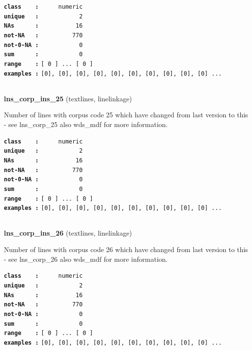 \documentclass[]{article}
\begin{document}
\textbf{\texttt{class\ \ \ \ :}} \texttt{~~~~~numeric}\\
\textbf{\texttt{unique\ \ \ :}} \texttt{~~~~~~~~~~~2}\\
\textbf{\texttt{NAs\ \ \ \ \ \ :}} \texttt{~~~~~~~~~~16}\\
\textbf{\texttt{not-NA\ \ \ :}} \texttt{~~~~~~~~~770}\\
\textbf{\texttt{not-0-NA\ :}} \texttt{~~~~~~~~~~~0}\\
\textbf{\texttt{sum\ \ \ \ \ \ :}} \texttt{~~~~~~~~~~~0}\\
\textbf{\texttt{range\ \ \ \ :}}
\texttt{{[}\ 0\ {]}\ ...\ {[}\ 0\ {]}}\\
\textbf{\texttt{examples\ :}}
\texttt{{[}0{]},\ {[}0{]},\ {[}0{]},\ {[}0{]},\ {[}0{]},\ {[}0{]},\ {[}0{]},\ {[}0{]},\ {[}0{]},\ {[}0{]}\ ...}\\

~

\textbf{lns\_corp\_ins\_25} (textlines, linelinkage)

Number of lines with corpus code 25 which have changed from last version
to this - see lns\_corp\_25 also wds\_mdf for more information.

\textbf{\texttt{class\ \ \ \ :}} \texttt{~~~~~numeric}\\
\textbf{\texttt{unique\ \ \ :}} \texttt{~~~~~~~~~~~2}\\
\textbf{\texttt{NAs\ \ \ \ \ \ :}} \texttt{~~~~~~~~~~16}\\
\textbf{\texttt{not-NA\ \ \ :}} \texttt{~~~~~~~~~770}\\
\textbf{\texttt{not-0-NA\ :}} \texttt{~~~~~~~~~~~0}\\
\textbf{\texttt{sum\ \ \ \ \ \ :}} \texttt{~~~~~~~~~~~0}\\
\textbf{\texttt{range\ \ \ \ :}}
\texttt{{[}\ 0\ {]}\ ...\ {[}\ 0\ {]}}\\
\textbf{\texttt{examples\ :}}
\texttt{{[}0{]},\ {[}0{]},\ {[}0{]},\ {[}0{]},\ {[}0{]},\ {[}0{]},\ {[}0{]},\ {[}0{]},\ {[}0{]},\ {[}0{]}\ ...}\\

~

\textbf{lns\_corp\_ins\_26} (textlines, linelinkage)

Number of lines with corpus code 26 which have changed from last version
to this - see lns\_corp\_26 also wds\_mdf for more information.

\textbf{\texttt{class\ \ \ \ :}} \texttt{~~~~~numeric}\\
\textbf{\texttt{unique\ \ \ :}} \texttt{~~~~~~~~~~~2}\\
\textbf{\texttt{NAs\ \ \ \ \ \ :}} \texttt{~~~~~~~~~~16}\\
\textbf{\texttt{not-NA\ \ \ :}} \texttt{~~~~~~~~~770}\\
\textbf{\texttt{not-0-NA\ :}} \texttt{~~~~~~~~~~~0}\\
\textbf{\texttt{sum\ \ \ \ \ \ :}} \texttt{~~~~~~~~~~~0}\\
\textbf{\texttt{range\ \ \ \ :}}
\texttt{{[}\ 0\ {]}\ ...\ {[}\ 0\ {]}}\\
\textbf{\texttt{examples\ :}}
\texttt{{[}0{]},\ {[}0{]},\ {[}0{]},\ {[}0{]},\ {[}0{]},\ {[}0{]},\ {[}0{]},\ {[}0{]},\ {[}0{]},\ {[}0{]}\ ...}\\
\end{document}
